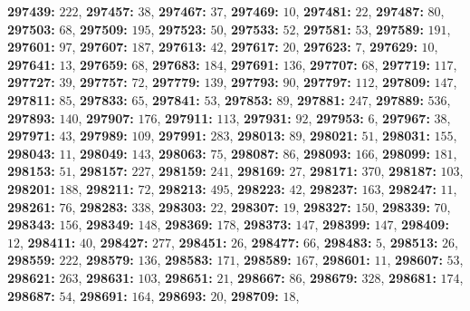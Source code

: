 \textsf{\bfseries 297439:} $222$, \textsf{\bfseries 297457:} $38$, \textsf{\bfseries 297467:} $37$, \textsf{\bfseries 297469:} $10$, \textsf{\bfseries 297481:} $22$, \textsf{\bfseries 297487:} $80$, \textsf{\bfseries 297503:} $68$, \textsf{\bfseries 297509:} $195$, \textsf{\bfseries 297523:} $50$, \textsf{\bfseries 297533:} $52$, \textsf{\bfseries 297581:} $53$, \textsf{\bfseries 297589:} $191$, \textsf{\bfseries 297601:} $97$, \textsf{\bfseries 297607:} $187$, \textsf{\bfseries 297613:} $42$, \textsf{\bfseries 297617:} $20$, \textsf{\bfseries 297623:} $7$, \textsf{\bfseries 297629:} $10$, \textsf{\bfseries 297641:} $13$, \textsf{\bfseries 297659:} $68$, \textsf{\bfseries 297683:} $184$, \textsf{\bfseries 297691:} $136$, \textsf{\bfseries 297707:} $68$, \textsf{\bfseries 297719:} $117$, \textsf{\bfseries 297727:} $39$, \textsf{\bfseries 297757:} $72$, \textsf{\bfseries 297779:} $139$, \textsf{\bfseries 297793:} $90$, \textsf{\bfseries 297797:} $112$, \textsf{\bfseries 297809:} $147$, \textsf{\bfseries 297811:} $85$, \textsf{\bfseries 297833:} $65$, \textsf{\bfseries 297841:} $53$, \textsf{\bfseries 297853:} $89$, \textsf{\bfseries 297881:} $247$, \textsf{\bfseries 297889:} $536$, \textsf{\bfseries 297893:} $140$, \textsf{\bfseries 297907:} $176$, \textsf{\bfseries 297911:} $113$, \textsf{\bfseries 297931:} $92$, \textsf{\bfseries 297953:} $6$, \textsf{\bfseries 297967:} $38$, \textsf{\bfseries 297971:} $43$, \textsf{\bfseries 297989:} $109$, \textsf{\bfseries 297991:} $283$, \textsf{\bfseries 298013:} $89$, \textsf{\bfseries 298021:} $51$, \textsf{\bfseries 298031:} $155$, \textsf{\bfseries 298043:} $11$, \textsf{\bfseries 298049:} $143$, \textsf{\bfseries 298063:} $75$, \textsf{\bfseries 298087:} $86$, \textsf{\bfseries 298093:} $166$, \textsf{\bfseries 298099:} $181$, \textsf{\bfseries 298153:} $51$, \textsf{\bfseries 298157:} $227$, \textsf{\bfseries 298159:} $241$, \textsf{\bfseries 298169:} $27$, \textsf{\bfseries 298171:} $370$, \textsf{\bfseries 298187:} $103$, \textsf{\bfseries 298201:} $188$, \textsf{\bfseries 298211:} $72$, \textsf{\bfseries 298213:} $495$, \textsf{\bfseries 298223:} $42$, \textsf{\bfseries 298237:} $163$, \textsf{\bfseries 298247:} $11$, \textsf{\bfseries 298261:} $76$, \textsf{\bfseries 298283:} $338$, \textsf{\bfseries 298303:} $22$, \textsf{\bfseries 298307:} $19$, \textsf{\bfseries 298327:} $150$, \textsf{\bfseries 298339:} $70$, \textsf{\bfseries 298343:} $156$, \textsf{\bfseries 298349:} $148$, \textsf{\bfseries 298369:} $178$, \textsf{\bfseries 298373:} $147$, \textsf{\bfseries 298399:} $147$, \textsf{\bfseries 298409:} $12$, \textsf{\bfseries 298411:} $40$, \textsf{\bfseries 298427:} $277$, \textsf{\bfseries 298451:} $26$, \textsf{\bfseries 298477:} $66$, \textsf{\bfseries 298483:} $5$, \textsf{\bfseries 298513:} $26$, \textsf{\bfseries 298559:} $222$, \textsf{\bfseries 298579:} $136$, \textsf{\bfseries 298583:} $171$, \textsf{\bfseries 298589:} $167$, \textsf{\bfseries 298601:} $11$, \textsf{\bfseries 298607:} $53$, \textsf{\bfseries 298621:} $263$, \textsf{\bfseries 298631:} $103$, \textsf{\bfseries 298651:} $21$, \textsf{\bfseries 298667:} $86$, \textsf{\bfseries 298679:} $328$, \textsf{\bfseries 298681:} $174$, \textsf{\bfseries 298687:} $54$, \textsf{\bfseries 298691:} $164$, \textsf{\bfseries 298693:} $20$, \textsf{\bfseries 298709:} $18$, 
